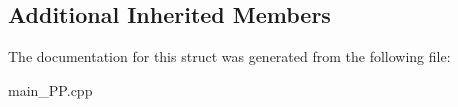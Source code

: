 \subsection*{Additional Inherited Members}


The documentation for this struct was generated from the following file\+:\begin{DoxyCompactItemize}
\item 
main\+\_\+\+P\+P.\+cpp\end{DoxyCompactItemize}
